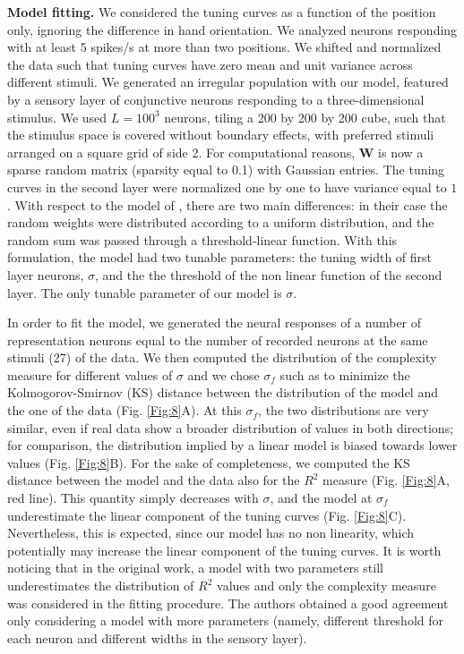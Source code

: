 \documentclass[a4paper]{article}%
\begin{document}
\textbf{Model fitting.} We considered the tuning curves as a function of the
position only, ignoring the difference in hand orientation. We analyzed
neurons responding with at least 5 spikes/s at more than two positions. We
shifted and normalized the data such that tuning curves have zero mean and
unit variance across different stimuli. We generated an irregular population
with our model, featured by a sensory layer of conjunctive neurons responding
to a three-dimensional stimulus. We used $L= 100^{3}$ neurons, tiling a 200 by
200 by 200 cube, such that the stimulus space is covered without boundary
effects, with preferred stimuli arranged on a square grid of side 2. For
computational reasons, $\mathbf{W}$ is now a sparse random matrix (sparsity
equal to 0.1) with Gaussian entries. The tuning curves in the second layer
were normalized one by one to have variance equal to $1$. With respect to the
model of \cite{Lalazar2016TuningConnectivity}, there are two main differences:
in their case the random weights were distributed according to a uniform
distribution, and the random sum was passed through a threshold-linear
function. With this formulation, the model had two tunable parameters: the
tuning width of first layer neurons, $\sigma$, and the the threshold of the
non linear function of the second layer. The only tunable parameter of our
model is $\sigma$.

In order to fit the model, we generated the neural responses of a number of
representation neurons equal to the number of recorded neurons at the same
stimuli (27) of the data. We then computed the distribution of the complexity
measure for different values of $\sigma$ and we chose $\sigma_{f}$ such as to
minimize the Kolmogorov-Smirnov (KS) distance between the distribution of the
model and the one of the data (Fig. \ref{Fig:8}A). At this $\sigma_{f}$, the
two distributions are very similar, even if real data show a broader
distribution of values in both directions; for comparison, the distribution
implied by a linear model is biased towards lower values (Fig. \ref{Fig:8}B).
For the sake of completeness, we computed the KS distance between the model
and the data also for the $R^{2}$ measure (Fig. \ref{Fig:8}A, red line). This
quantity simply decreases with $\sigma$, and the model at $\sigma_{f}$
underestimate the linear component of the tuning curves (Fig. \ref{Fig:8}C).
Nevertheless, this is expected, since our model has no non linearity, which
potentially may increase the linear component of the tuning curves. It is
worth noticing that in the original work, a model with two parameters still
underestimates the distribution of $R^{2}$ values and only the complexity
measure was considered in the fitting procedure. The authors obtained a good
agreement only considering a model with more parameters (namely, different
threshold for each neuron and different widths in the sensory layer).
\end{document}
